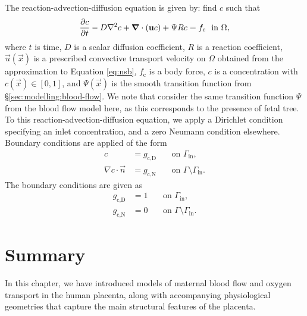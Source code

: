         The reaction-advection-diffusion equation is given by: find $c$ such that
        \begin{equation}
            \pdv{c}{t} - D \nabla^2 c + \vec{\nabla} \cdot (\vec{u} c) + \Psi Rc = f_\text{c} ~ \text{ in } \Omega,
            \label{eq:rad}%
        \end{equation}%
        where $t$ is time, $D$ is a scalar diffusion coefficient, $R$ is a reaction coefficient, $\vec{u}(\vec{x})$ is a prescribed convective transport velocity on $\Omega$ obtained from the approximation to Equation \eqref{eq:nsb}, $f_\text{c}$ is a body force, $c$ is a concentration with $c(\vec{x}) \in [0, 1]$, and $\Psi(\vec{x})$ is the smooth transition function from \S\ref{sec:modelling:blood-flow}. We note that consider the same transition function $\Psi$ from the blood flow model here, as this corresponds to the presence of fetal tree. To this reaction-advection-diffusion equation, we apply a Dirichlet condition specifying an inlet concentration, and a zero Neumann condition elsewhere. Boundary conditions are applied of the form
        \begin{subequations}
            \begin{alignat*}{3}
                c & = g_\text{c,D} &&~ \text{on } \Gamma_\text{in}, \\
                \nabla c \cdot \vec{n} & = g_\text{c,N} &&~ \text{on } \Gamma\setminus\Gamma_\text{in}.
            \end{alignat*}%
        \end{subequations}
        The boundary conditions are given as
        \begin{subequations}
            \begin{alignat}{3}
                g_\text{c,D} & = 1 &&~ \text{on } \Gamma_\text{in},\label{eq:oxygen-bcs:dirichlet}\\
                g_\text{c,N} & = 0 &&~ \text{on } \Gamma\setminus\Gamma_\text{in}.\label{eq:oxygen-bcs:neumann}%
            \end{alignat}%
            \label{eq:oxygen-bcs}%
        \end{subequations}%

    \section{Summary} \label{sec:modelling:summary}
        In this chapter, we have introduced models of maternal blood flow and oxygen transport in the human placenta, along with accompanying physiological geometries that capture the main structural features of the placenta.

